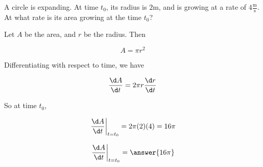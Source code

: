 \documentclass{ximera}
\author{Steven Gubkin}
\begin{document}
\begin{exercise}



A circle is expanding.  At time $t_0$, its radius is $2 \textrm{m}$, and is growing at a rate of $4 \frac{\textrm{m}}{\textrm{s}}$.  At what rate is its area growing at the time $t_0$?

\begin{hint}
	Let $A$ be the area, and $r$ be the radius.  Then

	\[A = \pi r^2\]
\end{hint}

\begin{hint}
	Differentiating with respect to time, we have

	\[\frac{\d A}{\d t} = 2\pi r \frac{\d r}{\d t}\]
\end{hint}

\begin{hint}
	So at time $t_0$,

	\[ \left.\frac{\d A}{\d t}\right|_{t = t_0} = 2 \pi (2) (4) = 16 \pi \]
\end{hint}

\begin{prompt}
	\[\left.\frac{\d A}{\d t}\right|_{t = t_0} = \answer{16\pi}\]
\end{prompt}

\end{exercise}
\end{document}
